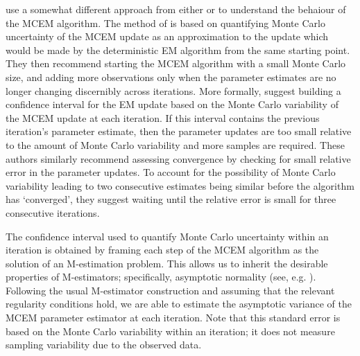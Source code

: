 \documentclass[11pt, oneside]{article}   	%
\begin{document}
 \citet{Boo99} use a somewhat different approach from either \citet{Wei90} or \citet{Cha95} to understand the behaiour of the MCEM algorithm. The method of \citeauthor{Boo99} is based on quantifying Monte Carlo uncertainty of the MCEM update as an approximation to the update which would be made by the deterministic EM algorithm from the same starting point. They then recommend starting the MCEM algorithm with a small Monte Carlo size, and adding more observations only when the parameter estimates are no longer changing discernibly across iterations. More formally, \citeauthor{Boo99} suggest building a confidence interval for the EM update based on the Monte Carlo variability of the MCEM update at each iteration. If this interval contains the previous iteration's parameter estimate, then the parameter updates are too small relative to the amount of Monte Carlo variability and more samples are required. These authors similarly recommend assessing convergence by checking for small relative error in the parameter updates. To account for the possibility of Monte Carlo variability leading to two consecutive estimates being similar before the algorithm has `converged', they suggest waiting until the relative error is small for three consecutive iterations.

The confidence interval used to quantify Monte Carlo uncertainty within an iteration is obtained by framing each step of the MCEM algorithm as the solution of an M-estimation problem. This allows us to inherit the desirable properties of M-estimators; specifically, asymptotic normality (see, e.g. \citealp{van98}). Following the usual M-estimator construction and assuming that the relevant regularity conditions hold, we are able to estimate the asymptotic variance of the MCEM parameter estimator at each iteration. Note that this standard error is based on the Monte Carlo variability within an iteration; it does not measure sampling variability due to the observed data. 
\end{document}
